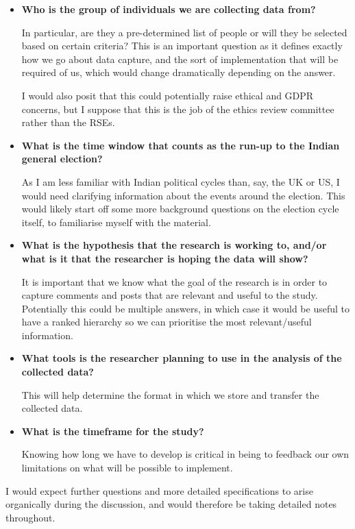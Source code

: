 \documentclass{article}
\begin{document}
\begin{itemize}
\item \textbf{Who is the group of individuals we are collecting data from?}

In particular, are they a pre-determined list of people or will they be selected based on certain criteria?
This is an important question as it defines exactly how we go about data capture, and the sort of implementation that will be required of us, which would change dramatically depending on the answer.

I would also posit that this could potentially raise ethical and GDPR concerns, but I suppose that this is the job of the ethics review committee rather than the RSEs.

\item \textbf{What is the time window that counts as the run-up to the Indian general election?}

As I am less familiar with Indian political cycles than, say, the UK or US, I would need clarifying information about the events around the election.
This would likely start off some more background questions on the election cycle itself, to familiarise myself with the material.

\item \textbf{What is the hypothesis that the research is working to, and/or what is it that the researcher is hoping the data will show?}

It is important that we know what the goal of the research is in order to capture comments and posts that are relevant and useful to the study.
Potentially this could be multiple answers, in which case it would be useful to have a ranked hierarchy so we can prioritise the most relevant/useful information.

\item \textbf{What tools is the researcher planning to use in the analysis of the collected data?}

This will help determine the format in which we store and transfer the collected data.

\item \textbf{What is the timeframe for the study?}

Knowing how long we have to develop is critical in being to feedback our own limitations on what will be possible to implement.
\end{itemize}

I would expect further questions and more detailed specifications to arise organically during the discussion, and would therefore be taking detailed notes throughout.
\end{document}
